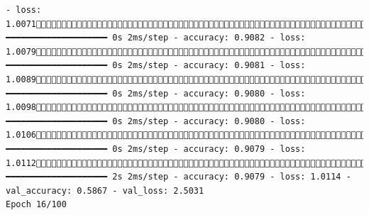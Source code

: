 \documentclass[
  letterpaper,
  DIV=11,
  numbers=noendperiod]{scrartcl}
\begin{document}
\begin{verbatim}
- loss: 1.0071698/858 ━━━━━━━━━━━━━━━━━━━━ 0s 2ms/step - accuracy: 0.9082 - loss: 1.0079733/858 ━━━━━━━━━━━━━━━━━━━━ 0s 2ms/step - accuracy: 0.9081 - loss: 1.0089767/858 ━━━━━━━━━━━━━━━━━━━━ 0s 2ms/step - accuracy: 0.9080 - loss: 1.0098803/858 ━━━━━━━━━━━━━━━━━━━━ 0s 2ms/step - accuracy: 0.9080 - loss: 1.0106841/858 ━━━━━━━━━━━━━━━━━━━━ 0s 2ms/step - accuracy: 0.9079 - loss: 1.0112858/858 ━━━━━━━━━━━━━━━━━━━━ 2s 2ms/step - accuracy: 0.9079 - loss: 1.0114 - val_accuracy: 0.5867 - val_loss: 2.5031
Epoch 16/100

\end{verbatim}
\end{document}
